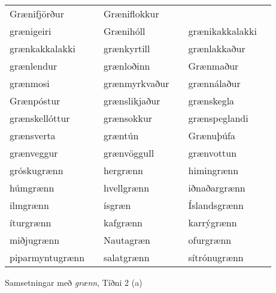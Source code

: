 \documentclass[../samsetningasafn.tex]{subfiles}
\begin{document}
\begin{wordlist}[H]
\begin{tcolorbox}
\begin{tabular}{BlBlBl}
		Grænifjörður		&		& 	
		Græniflokkur		&		\\ 	%
		grænigeiri		&		& 		
		Grænihóll		&		& 		
		grænikakkalakki	&		\\ 		%
		grænkakkalakki	&		& 		
		grænkyrtill		&		& 		
		grænlakkaður	&		\\ 	%
		grænlendur		&		& 		
		grænloðinn		&		& 		
		Grænmaður		&		\\ 	%
		grænmosi		&		& 		
		grænmyrkvaður	&		& 	
		grænnálaður		&		\\ 	%
		Grænpóstur		&		& 		
		grænslikjaður	&		& 	
		grænskegla		&		\\ 		%
		grænskellóttur	&		& 	
		grænsokkur		&		& 		
		grænspeglandi	&		\\ 	%
		grænsverta		&		& 		
		græntún			&		& 		
		Grænuþúfa		&		\\ 	 %
		grænveggur		&		& 		
		grænvöggull		&		& 		
		grænvottun		&		\\ 	%
		gróskugrænn		&		& 	
		hergrænn		&		& 		
		himingrænn		&		\\ 	%
		húmgrænn		&		& 		
		hvellgrænn		&		& 		
		iðnaðargrænn	&		\\ 	%
		ilmgrænn		&		& 		
		ísgræn			&		& 		
		Íslandsgrænn	&		\\ 	%
		íturgrænn		&		& 		
		kafgrænn		&		& 		
		karrýgrænn		&		\\ 	%
		miðjugrænn		&		& 		
		Nautagræn		&		& 		
		ofurgrænn		&		\\ 		%
		piparmyntugrænn & 		& 	
		salatgrænn		&		& 		
		sítrónugrænn	&		 	%
	\end{tabular}

\end{tcolorbox}
	\caption{Samsetningar með \textit{grænn}, Tíðni 2 (a)}
	\label{listi:graent.2a}
\end{wordlist}	
		
\end{document}
